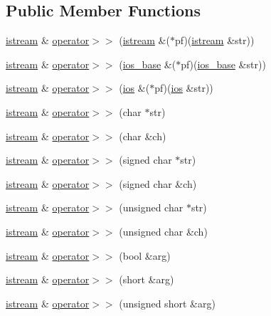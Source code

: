\subsection*{Public Member Functions}
\begin{DoxyCompactItemize}
\item 
\hyperlink{classistream}{istream} \& \hyperlink{classistream_afff8251a55ec0a1e2a3bbd8fa30363f9}{operator$>$$>$} (\hyperlink{classistream}{istream} \&($\ast$pf)(\hyperlink{classistream}{istream} \&str))
\item 
\hyperlink{classistream}{istream} \& \hyperlink{classistream_ad0d5bc6c173c87681682b17b804da0bd}{operator$>$$>$} (\hyperlink{classios__base}{ios\-\_\-base} \&($\ast$pf)(\hyperlink{classios__base}{ios\-\_\-base} \&str))
\item 
\hyperlink{classistream}{istream} \& \hyperlink{classistream_add466777efa1d9652e4a730c56505d79}{operator$>$$>$} (\hyperlink{classios}{ios} \&($\ast$pf)(\hyperlink{classios}{ios} \&str))
\item 
\hyperlink{classistream}{istream} \& \hyperlink{classistream_ae5b654c800919104cd2dd82e13d56e57}{operator$>$$>$} (char $\ast$str)
\item 
\hyperlink{classistream}{istream} \& \hyperlink{classistream_afecc866ac068cb7f51a6064632cf57a4}{operator$>$$>$} (char \&ch)
\item 
\hyperlink{classistream}{istream} \& \hyperlink{classistream_ad533daaaab4cb116abaa02ede8ab83e8}{operator$>$$>$} (signed char $\ast$str)
\item 
\hyperlink{classistream}{istream} \& \hyperlink{classistream_a138d2defe46dadae3ff3bab39ddfa4ad}{operator$>$$>$} (signed char \&ch)
\item 
\hyperlink{classistream}{istream} \& \hyperlink{classistream_ae4db6aae01f7652d2c322792dd40ac85}{operator$>$$>$} (unsigned char $\ast$str)
\item 
\hyperlink{classistream}{istream} \& \hyperlink{classistream_ae12c764279849d484410b2e971f33700}{operator$>$$>$} (unsigned char \&ch)
\item 
\hyperlink{classistream}{istream} \& \hyperlink{classistream_a48934c6ef41a85b779b64a8421e15ea4}{operator$>$$>$} (bool \&arg)
\item 
\hyperlink{classistream}{istream} \& \hyperlink{classistream_a363eeb29fb6a28e6a6c5fb7fb3d23e0b}{operator$>$$>$} (short \&arg)
\item 
\hyperlink{classistream}{istream} \& \hyperlink{classistream_aa282182fabb5c2076d138aecb3881046}{operator$>$$>$} (unsigned short \&arg)

\end{DoxyCompactItemize}
